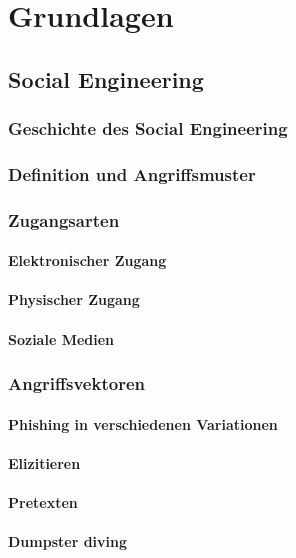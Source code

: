 \chapter{Grundlagen}\label{ch:Grundlagen}

\section{Social Engineering}

\subsection{Geschichte des Social Engineering}
\subsection{Definition und Angriffsmuster}

\subsection{Zugangsarten}

\subsubsection{Elektronischer Zugang}
\subsubsection{Physischer Zugang}
\subsubsection{Soziale Medien}
\subsection{Angriffsvektoren}

\subsubsection{Phishing in verschiedenen Variationen}
\subsubsection{Elizitieren}
\subsubsection{Pretexten}
\subsubsection{Dumpster diving}
